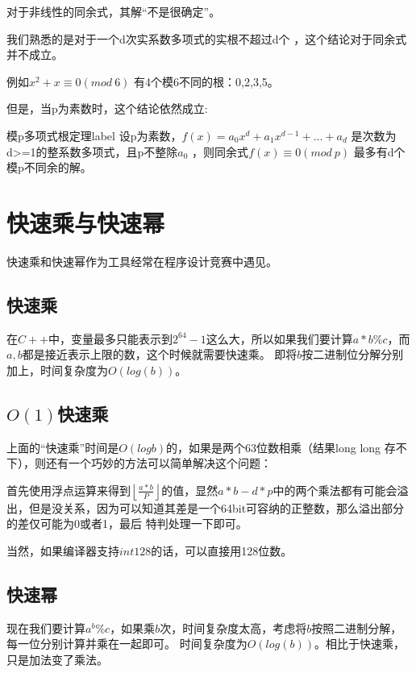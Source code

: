 

\vbox{}

对于非线性的同余式，其解“不是很确定”。

我们熟悉的是对于{\heiti 一个d次实系数多项式的实根不超过d个} ，这个结论对于同余式并不成立。

例如$x^2+x\equiv 0(mod\ 6)$ 有4个模6不同的根：0,2,3,5。

但是，{\heiti 当p为素数时，这个结论依然成立:}

\begin{theorem}{模p多项式根定理}{label}
设p为素数，$f(x)=a_0x^d+a_1x^{d-1}+...+a_d$ 是次数为d>=1的整系数多项式，且p不整除$a_0$ ，则同余式$f(x)\equiv 0(mod\ p)$ 最多有d个模p不同余的解。
\end{theorem}

\section{快速乘与快速幂}
快速乘和快速幂作为工具经常在程序设计竞赛中遇见。
\subsection{快速乘}
在$C++$中，变量最多只能表示到$2^{64}-1$这么大，所以如果我们要计算$a*b\%c$，而$a,b$都是接近表示上限的数，这个时候就需要快速乘。
即将$b$按二进制位分解分别加上，时间复杂度为$O(log(b))$。


\subsection{$O(1)$快速乘}
上面的“快速乘”时间是$O(logb)$的，如果是两个63位数相乘（结果long long 存不下），则还有一个巧妙的方法可以简单解决这个问题：



首先使用浮点运算来得到$\left\lfloor\frac{a * b}{P}\right\rfloor$的值，显然$a*b-d*p$中的两个乘法都有可能会溢出，但是没关系，因为可以知道其差是一个64bit可容纳的正整数，那么溢出部分的差仅可能为0或者1，最后
特判处理一下即可。	
\begin{note}
	当然，如果编译器支持$int128$的话，可以直接用128位数。
\end{note}

\subsection{快速幂}
现在我们要计算$a^b\%c$，如果乘$b$次，时间复杂度太高，考虑将$b$按照二进制分解，每一位分别计算并乘在一起即可。
时间复杂度为$O(log(b))$。相比于快速乘，只是加法变了乘法。



